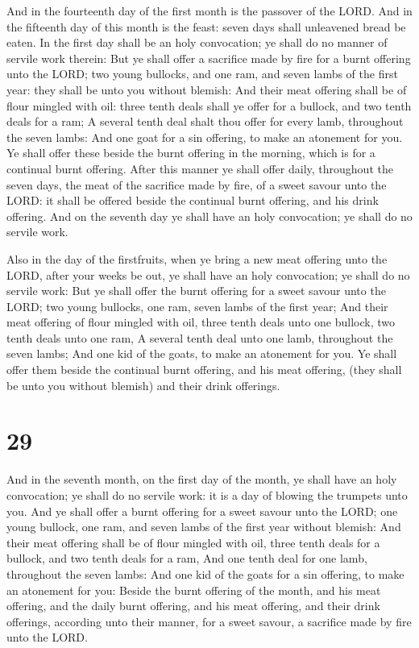  And in the fourteenth day of the first month is the
passover of the LORD.  And in the fifteenth day of this
month is the feast: seven days shall unleavened bread be eaten.
 In the first day shall be an holy convocation; ye shall
do no manner of servile work therein:  But ye shall offer
a sacrifice made by fire for a burnt offering unto the LORD; two young
bullocks, and one ram, and seven lambs of the first year: they shall be
unto you without blemish:  And their meat offering shall
be of flour mingled with oil: three tenth deals shall ye offer for a
bullock, and two tenth deals for a ram;  A several tenth
deal shalt thou offer for every lamb, throughout the seven lambs:
 And one goat for a sin offering, to make an atonement
for you.  Ye shall offer these beside the burnt offering
in the morning, which is for a continual burnt offering. 
After this manner ye shall offer daily, throughout the seven days, the
meat of the sacrifice made by fire, of a sweet savour unto the LORD: it
shall be offered beside the continual burnt offering, and his drink
offering.  And on the seventh day ye shall have an holy
convocation; ye shall do no servile work.

 Also in the day of the firstfruits, when ye bring a new
meat offering unto the LORD, after your weeks be out, ye shall have an
holy convocation; ye shall do no servile work:  But ye
shall offer the burnt offering for a sweet savour unto the LORD; two
young bullocks, one ram, seven lambs of the first year; 
And their meat offering of flour mingled with oil, three tenth deals
unto one bullock, two tenth deals unto one ram,  A
several tenth deal unto one lamb, throughout the seven lambs;
 And one kid of the goats, to make an atonement for you.
 Ye shall offer them beside the continual burnt offering,
and his meat offering, (they shall be unto you without blemish) and
their drink offerings.

\hypertarget{section-28}{%
\section{29}\label{section-28}}

 And in the seventh month, on the first day of the month,
ye shall have an holy convocation; ye shall do no servile work: it is a
day of blowing the trumpets unto you.  And ye shall offer
a burnt offering for a sweet savour unto the LORD; one young bullock,
one ram, and seven lambs of the first year without blemish:
 And their meat offering shall be of flour mingled with
oil, three tenth deals for a bullock, and two tenth deals for a ram,
 And one tenth deal for one lamb, throughout the seven
lambs:  And one kid of the goats for a sin offering, to
make an atonement for you:  Beside the burnt offering of
the month, and his meat offering, and the daily burnt offering, and his
meat offering, and their drink offerings, according unto their manner,
for a sweet savour, a sacrifice made by fire unto the LORD.

